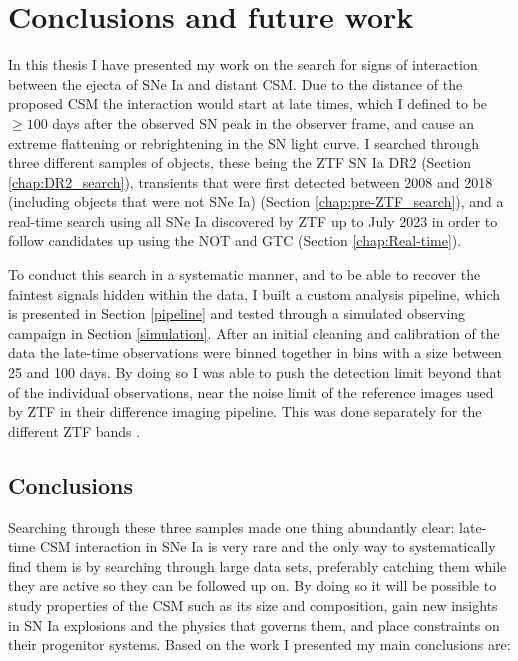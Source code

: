 \documentclass[a4paper,oneside,12pt, class=Latex/Classes/PhDthesisPSnPDF, crop=false]{standalone}
\begin{document}
\doublespacing
\chapter{Conclusions and future work}
\label{chap:Conc_and_fut}


In this thesis I have presented my work on the search for signs of interaction between the ejecta of SNe Ia and distant CSM. Due to the distance of the proposed CSM the interaction would start at late times, which I defined to be $\geq100$ days after the observed SN peak in the observer frame, and cause an extreme flattening or rebrightening in the SN light curve. I searched through three different samples of objects, these being the ZTF SN Ia DR2 (Section \ref{chap:DR2_search}), transients that were first detected between 2008 and 2018 (including objects that were not SNe Ia) (Section \ref{chap:pre-ZTF_search}), and a real-time search using all SNe Ia discovered by ZTF up to July 2023 in order to follow candidates up using the NOT and GTC (Section \ref{chap:Real-time}).

To conduct this search in a systematic manner, and to be able to recover the faintest signals hidden within the data, I built a custom analysis pipeline, which is presented in Section \ref{pipeline} and tested through a simulated observing campaign in Section \ref{simulation}. After an initial cleaning and calibration of the data the late-time observations were binned together in bins with a size between 25 and 100 days. By doing so I was able to push the detection limit beyond that of the individual observations, near the noise limit of the reference images used by ZTF in their difference imaging pipeline. This was done separately for the different ZTF bands \ztfg\ztfr\ztfi.


\section{Conclusions}
Searching through these three samples made one thing abundantly clear: late-time CSM interaction in SNe Ia is very rare and the only way to systematically find them is by searching through large data sets, preferably catching them while they are active so they can be followed up on. By doing so it will be possible to study properties of the CSM such as its size and composition, gain new insights in SN Ia explosions and the physics that governs them, and place constraints on their progenitor systems. Based on the work I presented my main conclusions are:
\end{document}
